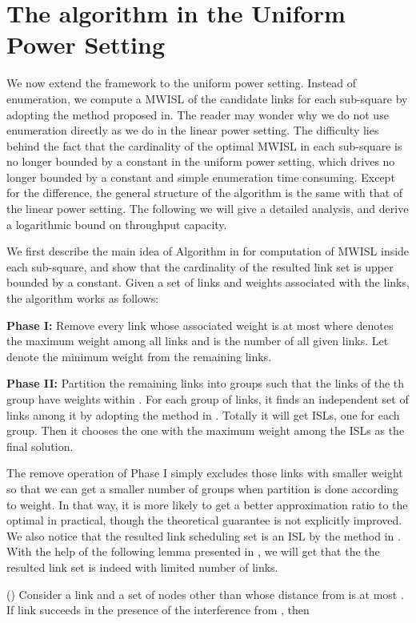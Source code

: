 \documentclass[journal]{IEEEtran}
\begin{document}
\section{The algorithm in the Uniform Power Setting}
We now extend the framework to the uniform power setting.
Instead of enumeration, we compute a MWISL of the candidate links for each sub-square by adopting the method
proposed in\cite{S:phy9}. The reader may wonder why we do not use enumeration directly as we do in the linear power setting. The difficulty lies behind the fact that the cardinality of the optimal MWISL in each sub-square is no longer bounded by a constant in the uniform power setting, which drives  no longer bounded by a constant and  simple enumeration time consuming.
Except for the difference, the general structure of the algorithm is the same with that of the linear power setting. The following we will give a detailed analysis, and derive a logarithmic bound on throughput capacity.

We first describe the main idea of Algorithm  in \cite{S:phy9} for computation of MWISL inside each sub-square, and show that the cardinality of the resulted link set is upper bounded by a constant. Given a set of links and weights associated with the links, the algorithm works as follows:

\textbf{Phase I:} Remove every link whose associated weight is at most  where  denotes the maximum weight among all links and  is the number of all given links. Let  denote the minimum weight from the remaining links.

\textbf{Phase II:}  Partition the remaining links into  groups such that  the links of the th group  have weights within . For each group  of links, it finds an independent set of links among it by adopting the method in \cite{S:phy4}. Totally it will get   ISLs, one for each group.
Then it chooses the one with the maximum weight among the  ISLs as the final solution.

The remove operation of Phase I simply excludes those links with smaller weight so that we can get a smaller number of groups when partition is done according to weight. In that way, it is more likely to get a better approximation ratio to the optimal in practical, though the theoretical guarantee is not explicitly improved. We also notice that the resulted link scheduling  set is an ISL by the method in \cite{S:phy4}.  With the help of the following lemma presented in \cite{S:phy4}, we will get that the the resulted link set is indeed with limited number of links.
\begin{lemma}(\cite{S:phy4})
Consider a link  and a set  of nodes other than  whose distance from  is at most . If link  succeeds in the presence of the interference from , then

\end{lemma}
\end{document}
